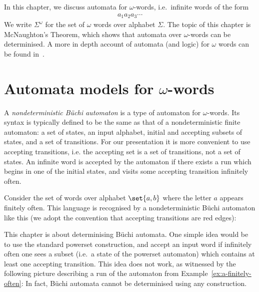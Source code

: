 In this chapter, we discuss automata for $\omega$-words, i.e.~infinite words of the form
\begin{align*}
  a_1 a_2 a_3 \cdots
\end{align*}
We write $\Sigma^\omega$ for the set of $\omega$ words over alphabet $\Sigma$.
The  topic of this chapter is McNaughton's Theorem, which shows that automata over $\omega$-words can be determinised. A more in depth account of automata (and logic) for $\omega$ words can be found in~\cite{Thomas:1997ec}.

\section{Automata models for $\omega$-words}
A \emph{nondeterministic Büchi automaton} is a type of automaton for $\omega$-words.  Its syntax is typically defined to be the same as that of a nondeterministic finite automaton: a set of states, an input alphabet, initial and accepting subsets of states, and a set of transitions. For our presentation it is  more convenient to use accepting transitions, i.e. the accepting set is a set of transitions, not a set of states. An infinite word is accepted by the automaton if there exists a run which begins in one of the initial states, and visits some accepting transition infinitely often.
\begin{example}\label{ex:a-finitely-often}
Consider the set of words over alphabet $\set{a,b}$ where the letter $a$ appears finitely often. This language is recognised by a nondeterministic Büchi automaton like this (we adopt the convention that accepting transitions are red edges):
\end{example}

This chapter is about determinising Büchi automata.  One simple idea would be to use the standard powerset construction, and accept an input word if infinitely often one sees a subset (i.e.~a state of the powerset automaton) which contains at least one accepting transition. This idea does not work, as witnessed by the following picture describing a run of the automaton from Example~\ref{ex:a-finitely-often}:
In fact, Büchi automata cannot be determinised using any construction.

